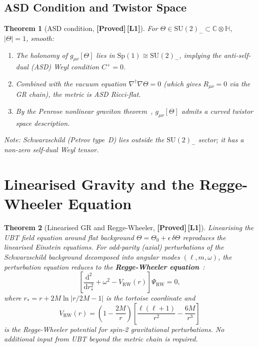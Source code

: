 \documentclass[12pt,a4paper]{article}
\newtheorem{theorem}{Theorem}[section]
\theoremstyle{definition}
\theoremstyle{remark}
\newcommand{\PROVED}{\textbf{[Proved]}}
\newcommand{\Lone}{\textbf{[L1]}}
\newcommand{\CC}{\mathbb{C}}
\newcommand{\HH}{\mathbb{H}}
\begin{document}
\subsection{ASD Condition and Twistor Space}

\begin{theorem}[ASD condition, \PROVED\,\Lone]
\label{thm:asd}
For $\Theta \in \mathrm{SU}(2)_- \subset \CC\otimes\HH$, $|\Theta| = 1$,
smooth:
\begin{enumerate}
  \item The holonomy of $g_{\mu\nu}[\Theta]$ lies in
        $\mathrm{Sp}(1) \cong \mathrm{SU}(2)_-$, implying the anti-self-dual
        (ASD) Weyl condition $C^+ = 0$.
  \item Combined with the vacuum equation $\nabla^\dagger\nabla\Theta = 0$
        (which gives $R_{\mu\nu} = 0$ via the GR chain), the metric is
        ASD Ricci-flat.
  \item By the Penrose nonlinear graviton theorem~\cite{penrose1976},
        $g_{\mu\nu}[\Theta]$ admits a curved twistor space description.
\end{enumerate}
\emph{Note}: Schwarzschild (Petrov type~D) lies outside the $\mathrm{SU}(2)_-$
sector; it has a non-zero self-dual Weyl tensor.
\end{theorem}

\section{Linearised Gravity and the Regge-Wheeler Equation}
\label{sec:rw}

\begin{theorem}[Linearised GR and Regge-Wheeler, \PROVED\,\Lone]
\label{thm:rw}
Linearising the UBT field equation around flat background
$\Theta = \Theta_0 + \epsilon\,\delta\Theta$
reproduces the linearised Einstein equations.
For odd-parity (axial) perturbations of the Schwarzschild background
decomposed into angular modes $(\ell,m,\omega)$,
the perturbation equation reduces to the
\textbf{Regge-Wheeler equation}~\cite{regge_wheeler1957}:
\[
  \left[\frac{\mathrm{d}^2}{\mathrm{d}r_*^2} + \omega^2
        - V_{\mathrm{RW}}(r)\right]\Psi_{\mathrm{RW}} = 0,
\]
where $r_* = r + 2M\ln|r/2M - 1|$ is the tortoise coordinate and
\[
  V_{\mathrm{RW}}(r)
  = \left(1 - \frac{2M}{r}\right)
    \left[\frac{\ell(\ell+1)}{r^2} - \frac{6M}{r^3}\right]
\]
is the Regge-Wheeler potential for spin-2 gravitational perturbations.
No additional input from UBT beyond the metric chain is required.
\end{theorem}
\end{document}
